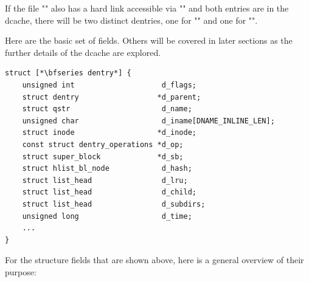 If the file "" also has a hard link accessible via "" and both entries are in the dcache, there will be two distinct dentries, one for "" and one for "".

Here are the basic set of  fields. Others will be covered in later sections as the further details of the dcache are explored.

\begin{lstlisting}
struct [*\bfseries dentry*] {
    unsigned int                    d_flags;
    struct dentry                  *d_parent; 
    struct qstr                     d_name;
    unsigned char                   d_iname[DNAME_INLINE_LEN];    
    struct inode                   *d_inode;
    const struct dentry_operations *d_op;
    struct super_block             *d_sb;   
    struct hlist_bl_node            d_hash;
    struct list_head                d_lru; 
    struct list_head                d_child;    
    struct list_head                d_subdirs;  
    unsigned long                   d_time;  
    ...
}
\end{lstlisting}

\noindent
For the structure fields that are shown above, here is a general overview of their purpose:

